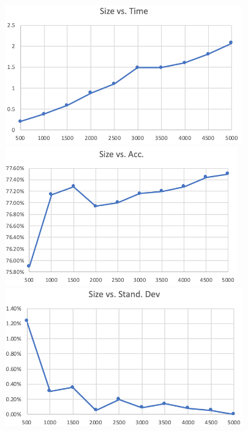 \documentclass[12pt]{article}
\begin{document}
    \bigbreak
    \includegraphics[height=6cm]{bayes_time_digit}
    \bigbreak
    \includegraphics[height=6cm]{bayes_acc_digit}
    \bigbreak
    \includegraphics[height=6cm]{bayes_std_digit}

\pagebreak
\end{document}
